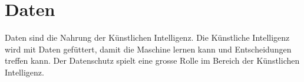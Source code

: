 \section{Daten}
\label{sec:data}

Daten sind die Nahrung der Künstlichen Intelligenz. Die Künstliche Intelligenz wird mit Daten
gefüttert, damit die Maschine lernen kann und Entscheidungen treffen kann. Der Datenschutz spielt eine grosse Rolle im Bereich der Künstlichen Intelligenz.

